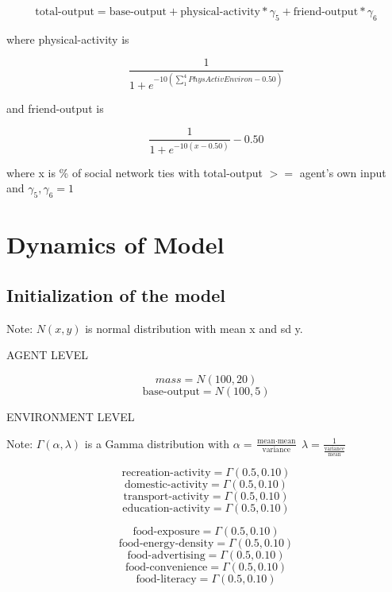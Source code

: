 \documentclass[12pt]{article}
\begin{document}
\begin{equation}
\text{total-output} = \text{base-output} + \text{physical-activity}*\gamma_5 + \text{friend-output}*\gamma_6
\end{equation}

where  physical-activity is

\begin{equation}
\frac{1}{1 + e^{-10(\sum_{1}^{4}PhysActivEnviron - 0.50)}}
\end{equation}

and friend-output is

\begin{equation}
\frac{1}{1 + e^{-10(x - 0.50)}} - 0.50
\end{equation}


where x is \% of social network ties with total-output $>=$ agent's own input and $\gamma_5, \gamma_6 = 1$


\section{Dynamics of Model}

\subsection{Initialization of the model}

Note: $N(x,y)$ is normal distribution with mean x and sd y.

AGENT LEVEL

$$ mass = N(100, 20)$$
$$ \text{base-output} = N(100, 5)$$

ENVIRONMENT LEVEL

Note: $\Gamma(\alpha, \lambda)$ is a Gamma distribution with
$\alpha = \frac{\text{mean} \cdot \text{mean}}{\text{variance}}$
$\lambda = \frac{1}{\frac{\text{variance}}{\text{mean}}}$

$$ \text{recreation-activity} = \Gamma(0.5, 0.10) $$
$$ \text{domestic-activity} = \Gamma(0.5, 0.10) $$
$$ \text{transport-activity} = \Gamma(0.5, 0.10) $$
$$ \text{education-activity} = \Gamma(0.5, 0.10) $$

$$ \text{food-exposure} = \Gamma(0.5, 0.10) $$
$$ \text{food-energy-density} = \Gamma(0.5, 0.10) $$
$$ \text{food-advertising} = \Gamma(0.5, 0.10) $$
$$ \text{food-convenience} = \Gamma(0.5, 0.10) $$
$$ \text{food-literacy} = \Gamma(0.5, 0.10) $$
\end{document}
